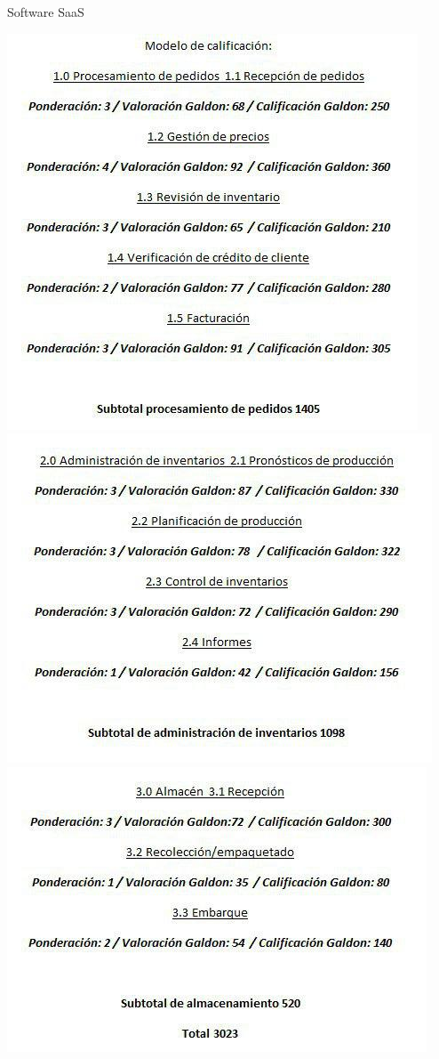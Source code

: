 \documentclass{beamer}
\begin{document}
\begin{frame}{Software SaaS}

\begin{center}
	\includegraphics[scale=0.35]{imagenes/Galdon1.jpg}
	\includegraphics[scale=0.35]{imagenes/Galdon2.jpg}
	\includegraphics[scale=0.35]{imagenes/Galdon3.jpg}
\end{center}
	
\end{frame}
\end{document}
